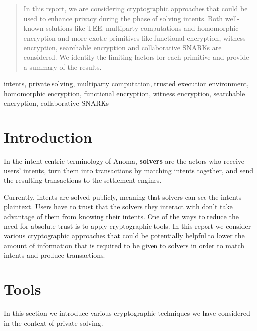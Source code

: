 \documentclass[final]{msc}
\begin{document}


\begin{abstract}

In this report, we are considering cryptographic approaches that could be used to enhance privacy during the phase of solving intents. Both well-known solutions like TEE, multiparty computations and homomorphic encryption and more exotic primitives like functional encryption, witness encryption, searchable encryption and collaborative SNARKs are considered. We identify the limiting factors for each primitive and provide a summary of the results.

\end{abstract}

\begin{keywords}
intents, private solving, multiparty computation, trusted execution environment, homomorphic encryption, functional encryption, witness encryption, searchable encryption, collaborative SNARKs
\end{keywords}
\maketitle

\section{Introduction}

In the intent-centric terminology of Anoma, \textbf{solvers} are the actors who receive users' intents, turn them into transactions by matching intents together, and send the resulting transactions to the settlement engines. 

Currently, intents are solved publicly, meaning that solvers can see the intents plaintext. Users have to trust that the solvers they interact with don't take advantage of them from knowing their intents. One of the ways to reduce the need for absolute trust is to apply cryptographic tools. In this report we consider various cryptographic approaches that could be potentially helpful to lower the amount of information that is required to be given to solvers in order to match intents and produce transactions.

\section{Tools}

In this section we introduce various cryptographic techniques we have considered in the context of private solving. 
\end{document}
